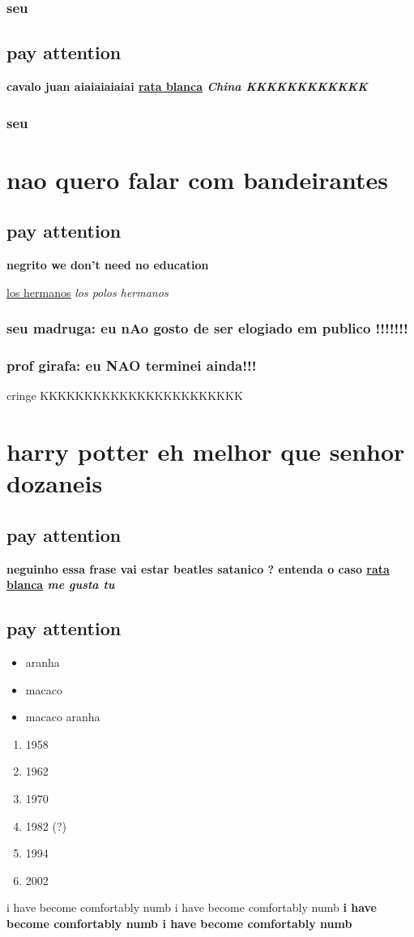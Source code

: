 \documentclass[12pt]{article}
\begin{document}
\subsection{seu}
\section{pay attention}
\bf{cavalo juan}  aiaiaiaiaiai 
\underline{rata blanca} \it{China KKKKKKKKKKKK}\par
\subsection{seu}
\chapter{nao quero falar com bandeirantes}
\section{pay attention}
\bf{negrito} we don't need no education\par 
\underline{los hermanos} \it{los polos hermanos}\par
\subsection{seu madruga: eu nAo gosto de ser elogiado em publico !!!!!!!}
\subsection{prof girafa: eu NAO terminei ainda!!!}
cringe KKKKKKKKKKKKKKKKKKKKKKK\par
\chapter{harry potter eh melhor que senhor dozaneis}
\section{pay attention}
\bf{neguinho essa frase vai estar} beatles satanico ? entenda o caso 
\underline{rata blanca} \it{me gusta tu}\par
\section{pay attention}
\begin{itemize} 
\item aranha 
\item macaco
\item macaco aranha
\end{itemize}
\begin{enumerate} 
\item 1958
\item 1962
\item 1970
\item 1982 (?)
\item 1994
\item 2002
\end{enumerate}
i have become comfortably numb
i have become comfortably numb \bf{i have become comfortably numb}
i have become comfortably numb \par
\end{document}
